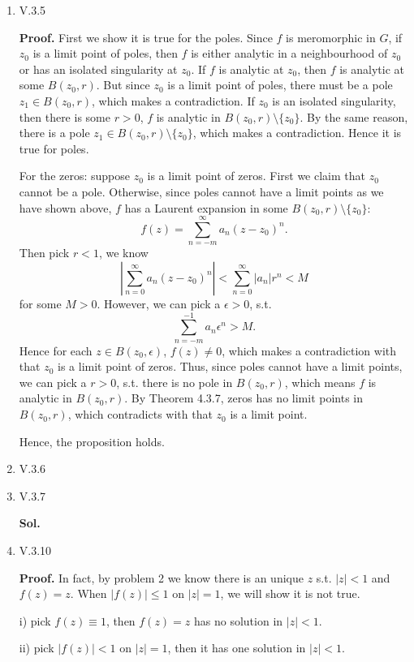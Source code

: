 \documentclass{article}%
\begin{document}
\begin{enumerate}
\item V.3.5

\textbf{Proof.}
First we show it is true for the poles. Since $f$ is meromorphic in $G$, if $z_0 $ is a limit point of poles, then $f$ is either analytic in a neighbourhood of $z_0 $ or has an isolated singularity at $z_0 $. If $f$ is analytic at $z_0 $, then $f$ is analytic at some $B(z_0, r)$. But since $z_0 $ is a limit point of poles, there must be a pole $z_1\in B(z_0, r)$, which makes a contradiction. If $z_0 $ is an isolated singularity, then there is some $r > 0$, $f$ is analytic in $B(z_0, r)\setminus\{z_0\}$. By the same reason, there is a pole $z_1\in B(z_0, r)\setminus\{z_0\}$, which makes a contradiction. Hence it is true for poles.

For the zeros: suppose $z_0 $ is a limit point of zeros. First we claim that $z_0 $ cannot be a pole. Otherwise, since poles cannot have a limit points as we have shown above, $f$ has a Laurent expansion in some $B(z_0, r)\setminus\{z_0\}$:
$$
f(z) = \sum_{n=-m}^{\infty}a_n(z-z_0)^n.
$$
Then pick $r < 1$, we know
$$
\left|\sum_{n=0}^{\infty}a_n (z-z_0)^n\right| < \sum_{n=0}^{\infty}|a_n|r^n < M
$$
for some $M > 0$. However, we can pick a $\epsilon > 0$, s.t. 
$$
\sum_{n=-m}^{-1}a_n\epsilon^n > M.
$$
Hence for each $z\in B(z_0, \epsilon)$, $f(z)\ne 0$, which makes a contradiction with that $z_0 $ is a limit point of zeros. Thus, since poles cannot have a limit points, we can pick a $r > 0$, s.t. there is no pole in $B(z_0, r)$, which means $f$ is analytic in $B(z_0, r)$. By Theorem 4.3.7, zeros has no limit points in $B(z_0, r)$, which contradicts with that $z_0 $ is a limit point.

Hence, the proposition holds.

\item V.3.6



\item V.3.7

\textbf{Sol.}



\item V.3.10

\textbf{Proof.} In fact, by problem 2 we know there is an unique $z$ s.t. $|z| < 1$ and $f(z) = z$. When $|f(z)| \le 1$ on $|z| = 1$, we will show it is not true.

i) pick $f(z) \equiv 1$, then $f(z) = z$ has no solution in $|z| < 1$.

ii) pick $|f(z)| < 1$ on $|z| = 1$, then it has one solution in $|z| < 1$.


\end{enumerate}
\end{document}
